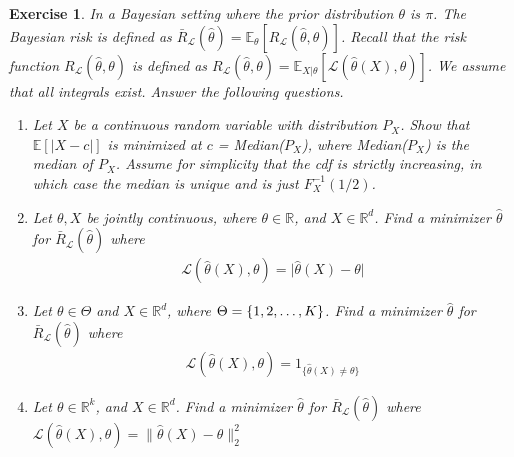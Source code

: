 \documentclass[12pt]{article}
\theoremstyle{colon}
\newtheorem{exercise}{Exercise}
\begin{document}
\begin{exercise}
  In a Bayesian setting where the prior distribution $\theta$ is $\pi$. The Bayesian risk is defined as $\bar{R}_\mathcal{L}(\widehat{\theta}) = \mathbb{E}_\theta [R_\mathcal{L}(\widehat{\theta}, \theta)]$. Recall that the risk function $R_\mathcal{L}(\widehat{\theta}, \theta)$ is defined as $R_\mathcal{L}(\widehat{\theta}, \theta) = \mathbb{E}_{X|\theta}[\mathcal{L}(\widehat{\theta}(X),\theta)]$. We assume that all integrals exist. Answer the following questions.
  \begin{enumerate}[label=\arabic*)]
    \item Let $X$ be a continuous random variable with distribution $P_X$. Show that $\mathbb{E}[\lvert X-c \rvert]$ is minimized at $c$ = Median($P_X$), where Median($P_X$) is the median of $P_X$. Assume for simplicity that the cdf is strictly increasing, in which case the median is unique and is just $F_X^{-1}(1/2)$.
    \item Let $\theta, X$ be jointly continuous, where $\theta \in \mathbb{R}$, and $X \in \mathbb{R}^d$. Find a minimizer $\widehat{\theta}$ for $\bar{R}_\mathcal{L}(\widehat{\theta})$ where
      \begin{gather*}
        \mathcal{L}(\widehat{\theta}(X), \theta) = \lvert \widehat{\theta}(X) - \theta \rvert
      \end{gather*}
    \item Let $\theta \in \Theta$ and $X \in \mathbb{R}^d$, where $\Theta = \{1,2,\mathellipsis,K\}$. Find a minimizer $\widehat{\theta}$ for $\bar{R}_\mathcal{L}(\widehat{\theta})$ where
      \begin{gather*}
        \mathcal{L}(\widehat{\theta}(X), \theta) = 1_{\{ \widehat{\theta}(X) \neq \theta \}}
      \end{gather*}
    \item Let $\theta \in \mathbb{R}^k$, and $X \in \mathbb{R}^d$. Find a minimizer $\widehat{\theta}$ for $\bar{R}_\mathcal{L}(\widehat{\theta})$ where $\mathcal{L}(\widehat{\theta}(X), \theta) = \lVert \widehat{\theta}(X) - \theta \rVert_2^2$
  \end{enumerate}
\end{exercise}
\end{document}
